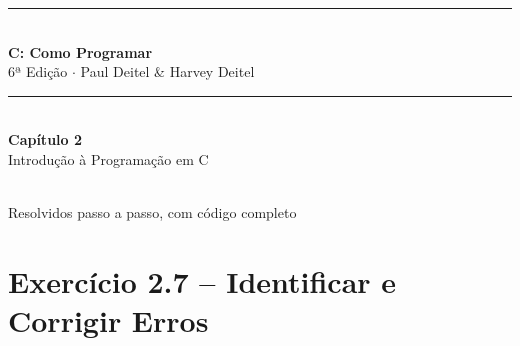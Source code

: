 \documentclass[12pt,a4paper]{article}
\begin{document}
\begin{titlepage}
  \centering\vspace*{2cm}
  {\color{deitelblue}\rule{\linewidth}{2pt}}\\[0.4cm]
  {\huge\bfseries\color{deitelblue}C: Como Programar}\\[0.2cm]
  {\large\color{deitelblue}6ª Edição $\cdot$ Paul Deitel \& Harvey Deitel}\\[0.2cm]
  {\color{deitelblue}\rule{\linewidth}{2pt}}\\[1cm]
  {\LARGE\bfseries Capítulo 2}\\[0.3cm]
  {\Large\color{deitelblue!80}Introdução à Programação em C}\\[0.8cm]
  \begin{tcolorbox}[colback=deitellightblue,colframe=deitelblue,width=0.85\linewidth]
    \\[0.2cm]
    {\normalsize Resolvidos passo a passo, com código completo}
  \end{tcolorbox}
\end{titlepage}

\tableofcontents\newpage

\section{Exercício 2.7 -- Identificar e Corrigir Erros}
\end{document}
